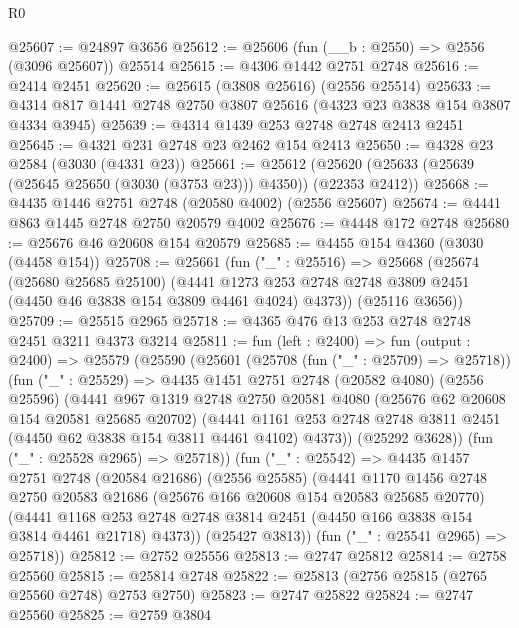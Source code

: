 \begin{lexlean}{R0}
\begin{coremodule}
@25607 := @24897 @3656
@25612 := @25606 (fun (__b : @2550) => @2556 (@3096 @25607)) @25514
@25615 := @4306 @1442 @2751 @2748
@25616 := @2414 @2451
@25620 := @25615 (@3808 @25616) (@2556 @25514)
@25633 := @4314 @817 @1441 @2748 @2750 @3807 @25616 (@4323 @23 @3838 @154 @3807 @4334 @3945)
@25639 := @4314 @1439 @253 @2748 @2748 @2413 @2451
@25645 := @4321 @231 @2748 @23 @2462 @154 @2413
@25650 := @4328 @23 @2584 (@3030 (@4331 @23))
@25661 := @25612 (@25620 (@25633 (@25639 (@25645 @25650 (@3030 (@3753 @23))) @4350)) (@22353 @2412))
@25668 := @4435 @1446 @2751 @2748 (@20580 @4002) (@2556 @25607)
@25674 := @4441 @863 @1445 @2748 @2750 @20579 @4002
@25676 := @4448 @172 @2748
@25680 := @25676 @46 @20608 @154 @20579
@25685 := @4455 @154 @4360 (@3030 (@4458 @154))
@25708 := @25661
    (fun ("_" : @25516) =>
    @25668
      (@25674
        (@25680 @25685 @25100)
        (@4441 @1273 @253 @2748 @2748 @3809 @2451 (@4450 @46 @3838 @154 @3809 @4461 @4024) @4373))
      (@25116 @3656))
@25709 := @25515 @2965
@25718 := @4365 @476 @13 @253 @2748 @2748 @2451 @3211 @4373 @3214
@25811 := fun (left : @2400) =>
  fun (output : @2400) =>
  @25579
    (@25590
      (@25601
        (@25708 (fun ("_" : @25709) => @25718))
        (fun ("_" : @25529) =>
        @4435
          @1451
          @2751
          @2748
          (@20582 @4080)
          (@2556 @25596)
          (@4441
            @967
            @1319
            @2748
            @2750
            @20581
            @4080
            (@25676 @62 @20608 @154 @20581 @25685 @20702)
            (@4441
              @1161
              @253
              @2748
              @2748
              @3811
              @2451
              (@4450 @62 @3838 @154 @3811 @4461 @4102)
              @4373))
          (@25292 @3628))
        (fun ("_" : @25528 @2965) => @25718))
      (fun ("_" : @25542) =>
      @4435
        @1457
        @2751
        @2748
        (@20584 @21686)
        (@2556 @25585)
        (@4441
          @1170
          @1456
          @2748
          @2750
          @20583
          @21686
          (@25676 @166 @20608 @154 @20583 @25685 @20770)
          (@4441
            @1168
            @253
            @2748
            @2748
            @3814
            @2451
            (@4450 @166 @3838 @154 @3814 @4461 @21718)
            @4373))
        (@25427 @3813))
      (fun ("_" : @25541 @2965) => @25718))
@25812 := @2752 @25556
@25813 := @2747 @25812
@25814 := @2758 @25560
@25815 := @25814 @2748
@25822 := @25813 (@2756 @25815 (@2765 @25560 @2748) @2753 @2750)
@25823 := @2747 @25822
@25824 := @2747 @25560
@25825 := @2759 @3804

\end{coremodule}
\end{lexlean}
